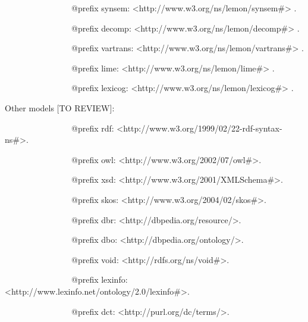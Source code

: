 \documentclass[a4paper]{article}
\newcommand\textstyleSourceText[1]{\textrm{#1}}
\begin{document}
\textstyleSourceText{\ \ \ \ \ \ \ \ \ \ \ \ \ \ \ \ @prefix synsem: {\textless}http://www.w3.org/ns/lemon/synsem\#{\textgreater} .}

\textstyleSourceText{\ \ \ \ \ \ \ \ \ \ \ \ \ \ \ \ @prefix decomp: {\textless}http://www.w3.org/ns/lemon/decomp\#{\textgreater} .}

\textstyleSourceText{\ \ \ \ \ \ \ \ \ \ \ \ \ \ \ \ @prefix vartrans: {\textless}http://www.w3.org/ns/lemon/vartrans\#{\textgreater} .}

\textstyleSourceText{\ \ \ \ \ \ \ \ \ \ \ \ \ \ \ \ @prefix lime: {\textless}http://www.w3.org/ns/lemon/lime\#{\textgreater} .}

\textstyleSourceText{\ \ \ \ \ \ \ \ \ \ \ \ \ \ \ \ @prefix lexicog: {\textless}http://www.w3.org/ns/lemon/lexicog\#{\textgreater} .}


\bigskip


\bigskip

Other models [TO REVIEW]: 


\bigskip

\textstyleSourceText{\ \ \ \ \ \ \ \ \ \ \ \ \ \ \ \ @prefix rdf: {\textless}http://www.w3.org/1999/02/22-rdf-syntax-ns\#{\textgreater}.}

\textstyleSourceText{\ \ \ \ \ \ \ \ \ \ \ \ \ \ \ \ @prefix owl: {\textless}http://www.w3.org/2002/07/owl\#{\textgreater}.}

\textstyleSourceText{\ \ \ \ \ \ \ \ \ \ \ \ \ \ \ \ @prefix xsd: {\textless}http://www.w3.org/2001/XMLSchema\#{\textgreater}.}

\textstyleSourceText{\ \ \ \ \ \ \ \ \ \ \ \ \ \ \ \ @prefix skos: {\textless}http://www.w3.org/2004/02/skos\#{\textgreater}.}

\textstyleSourceText{\ \ \ \ \ \ \ \ \ \ \ \ \ \ \ \ @prefix dbr: {\textless}http://dbpedia.org/resource/{\textgreater}.}

\textstyleSourceText{\ \ \ \ \ \ \ \ \ \ \ \ \ \ \ \ @prefix dbo: {\textless}http://dbpedia.org/ontology/{\textgreater}.}

\textstyleSourceText{\ \ \ \ \ \ \ \ \ \ \ \ \ \ \ \ @prefix void: {\textless}http://rdfs.org/ns/void\#{\textgreater}.}

\textstyleSourceText{\ \ \ \ \ \ \ \ \ \ \ \ \ \ \ \ @prefix lexinfo: {\textless}http://www.lexinfo.net/ontology/2.0/lexinfo\#{\textgreater}.}

\textstyleSourceText{\ \ \ \ \ \ \ \ \ \ \ \ \ \ \ \ @prefix dct: {\textless}http://purl.org/dc/terms/{\textgreater}.}
\end{document}
